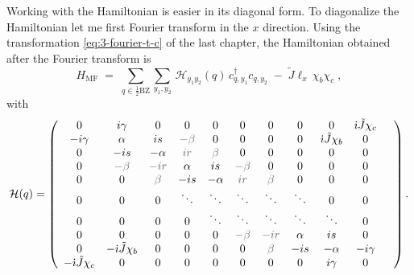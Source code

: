 Working with the Hamiltonian is easier in its diagonal form. To diagonalize the Hamiltonian let me first Fourier transform in the $x$ direction. Using the transformation \eqref{eq:3-fourier-t-c} of the last chapter, the Hamiltonian obtained after the Fourier transform is 
\begin{equation}
    H_{\text{MF}} \; = \; \sum_{q \in \frac{1}{2}\text{BZ}} \sum_{y_1,y_2} \, \mathcal{H}_{y_1y_2}(q) \, c_{q,y_1}^{\dagger} c_{q,y_2} \;- \; \tilde{J}\ell_x \, \chi_b \chi_c \; ,
\end{equation}
with 
\begin{equation}
  \mathcal{H}(q) = 
   \left(
\begin{array}{cccccccccccc}
 0 & i \gamma  & 0 & 0 & 0 & 0 & 0 & 0 & 0 &  \im \tilde{J} \chi_c %
 \\
 -i \gamma  & \alpha  & i s & \textcolor{black!60}{-\textcolor{black!60}{\beta}}  & 0 & 0 & 0 & 0 & \im \tilde{J} \chi_b & 0%
 \\
 0 & -i s & -\alpha  & \textcolor{black!60}{i r} & \textcolor{black!60}{\beta}  & 0 & 0 & 0 & 0 &0
 \\
 0 & \textcolor{black!60}{-\textcolor{black!60}{\beta}}  & \textcolor{black!60}{- i r} & \alpha  & i s & \textcolor{black!60}{-\textcolor{black!60}{\beta}}  & 0 & 0 & 0 & 0%
 \\
 0 & 0 & \textcolor{black!60}{\beta}  & -i s & -\alpha  & \textcolor{black!60}{i r} & \textcolor{black!60}{\beta}  & 0 & 0 & 0 %
 \\
 0 & 0 & 0 & \ddots  &  \ddots & \ddots  & \ddots & \ddots  & 0 & 0%
 \\
 0 & 0 & 0 & 0 & \ddots & \ddots & \ddots  & \ddots &  \ddots  & 0 & %
 \\%
0 & 0 & 0 & 0 & 0 & \textcolor{black!60}{-\textcolor{black!60}{\beta}}  & \textcolor{black!60}{- i r} & \alpha  & i s & 0 \\
0 &  -\im \tilde{J} \chi_b & 0 & 0 & 0 & 0 & \textcolor{black!60}{\beta}  & -i s & -\alpha  & -i \gamma  \\
- \im \tilde{J} \chi_c & 0 & 0 & 0 & 0 & 0 & 0 & 0 & i \gamma  & 0 \\
\end{array} \right). \label{eq:4-MF-Ham}
\end{equation}


